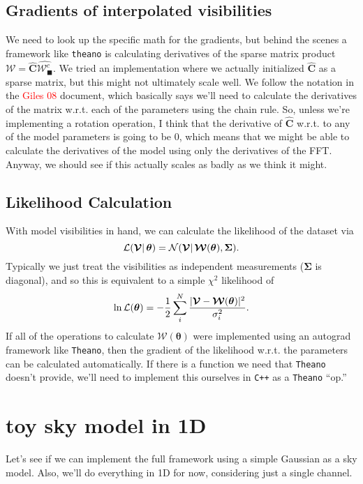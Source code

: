 \documentclass[modern]{aastex62}
\newcommand{\todo}[1]{ \textcolor{red}{#1}}
\newcommand{\vd}{\boldsymbol{\mathcal{V}}} %
\newcommand{\vm}{\boldsymbol{\mathcal{W}}} %
\newcommand{\btheta}{\boldsymbol{\theta}} %
\begin{document}
\subsection{Gradients of interpolated visibilities}
We need to look up the specific math for the gradients, but behind the scenes a framework like \texttt{theano} is calculating derivatives of the sparse matrix product $\vm = \hat{\boldsymbol{C}} \hat{\vm_\blacksquare^c}$. We tried an implementation where we actually initialized $\hat{\boldsymbol{C}}$ as a sparse matrix, but this might not ultimately scale well. We follow the notation in the \todo{Giles 08} document, which basically says we'll need to calculate the derivatives of the matrix w.r.t. each of the parameters using the chain rule. So, unless we're implementing a rotation operation, I think that the derivative of $\hat{\boldsymbol{C}}$ w.r.t. to any of the model parameters is going to be $0$, which means that we might be able to calculate the derivatives of the model using only the derivatives of the FFT. Anyway, we should see if this actually scales as badly as we think it might. 

\subsection{Likelihood Calculation}

With model visibilities in hand, we can calculate the likelihood of the dataset via
\begin{equation}
    {\cal L}(\vd |\, \boldsymbol{\theta}) = {\cal N}(\boldsymbol{\mathcal{V}} |\, \boldsymbol{\mathcal{W}}(\boldsymbol{\theta}), \boldsymbol{\Sigma}).
\end{equation}
Typically we just treat the visibilities as independent measurements ($\boldsymbol{\Sigma}$ is diagonal), and so this is equivalent to a simple $\chi^2$ likelihood of
\begin{equation}
    \ln {\cal L}(\btheta) = - \frac{1}{2} \sum_i^N \frac{|\vd - \vm(\btheta)|^2}{\sigma_i^2}.
\end{equation}
If all of the operations to calculate $\vm(\btheta)$ were implemented using an autograd framework like \texttt{Theano}, then the gradient of the likelihood w.r.t. the parameters can be calculated automatically. If there is a function we need that \texttt{Theano} doesn't provide, we'll need to implement this ourselves in \texttt{C++} as a \texttt{Theano} ``op.''

\section{toy sky model in 1D}
Let's see if we can implement the full framework using a simple Gaussian as a sky model. Also, we'll do everything in 1D for now, considering just a single channel.
\end{document}
